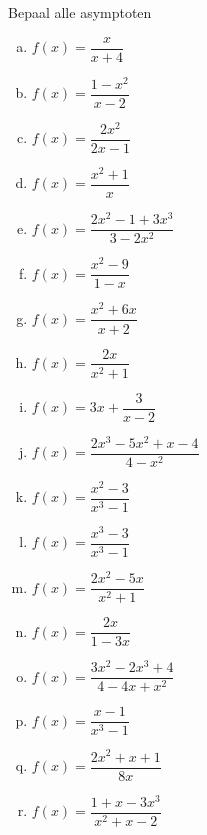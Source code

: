 \documentclass[12pt,twoside,a4paper]{article}
\begin{document}
\begin{oefening} %
Bepaal alle asymptoten\\
\begin{multicols}{3}
\begin{enumerate}[(a)]
  \itemsep1em
  \item $\displaystyle f(x)=\dfrac{x}{x+4}$
  \item $\displaystyle f(x)=\dfrac{1-x^2}{x-2}$
  \item $\displaystyle f(x)=\dfrac{2x^2}{2x-1}$
  \item $\displaystyle f(x)=\dfrac{x^2+1}{x}$
  \item $\displaystyle f(x)=\dfrac{2x^2-1+3x^3}{3-2x^2}$
  \item $\displaystyle f(x)=\dfrac{x^2-9}{1-x}$
  \item $\displaystyle f(x)=\dfrac{x^2+6x}{x+2}$
  \item $\displaystyle f(x)=\dfrac{2x}{x^2+1}$
  \item $\displaystyle f(x)=3x+\dfrac{3}{x-2}$
  \item $\displaystyle f(x)=\dfrac{2x^3-5x^2+x-4}{4-x^2}$
  \item $\displaystyle f(x)=\dfrac{x^2-3}{x^3-1}$
  \item $\displaystyle f(x)=\dfrac{x^3-3}{x^3-1}$
  \item $\displaystyle f(x)=\dfrac{2x^2-5x}{x^2+1}$
  \item $\displaystyle f(x)=\dfrac{2x}{1-3x}$
  \item $\displaystyle f(x)=\dfrac{3x^2-2x^3+4}{4-4x+x^2}$
  \item $\displaystyle f(x)=\dfrac{x-1}{x^3-1}$
  \item $\displaystyle f(x)=\dfrac{2x^2+x+1}{8x}$
  \item $\displaystyle f(x)=\dfrac{1+x-3x^3}{x^2+x-2}$
\end{enumerate}
\end{multicols}
\end{oefening}
\end{document}
